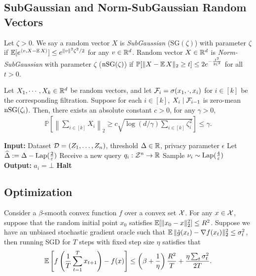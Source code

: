 \subsection{SubGaussian and Norm-SubGaussian Random Vectors}
\begin{definition}
Let $\zeta > 0$. We say a random vector $X$ is \emph{SubGaussian} ($\mathrm{SG}(\zeta)$) with parameter $\zeta$ if %
$\operatorname*{\mathbb{E}}[e^{\langle v,X-\operatorname*{\mathbb{E}} X\rangle}]\le e^{\|v\|^2\zeta^2/2}$ for any $v\in \mathbb{R}^d$.
Random vector $X\in \mathbb{R}^d$ is \emph{Norm-SubGaussian} with parameter $\zeta$ ($\mathrm{nSG}(\zeta)$) if 
$\mathbb{P}[\|X-\operatorname*{\mathbb{E}} X\|_2\ge t]\le 2e^{-\frac{t^2}{2\zeta^2}}$ for all $t > 0$.
\end{definition}

\begin{theorem}
\label{thm:hoeffding_nSG}
    Let $X_1,\cdots,X_k\in\mathbb{R}^d$ be random vectors, and let $\mathcal{F}_i=\sigma(x_1,\cdot,x_i)$ for $i\in[k]$ be the corresponding filtration.
    Suppose for each $i\in[k]$, $X_i\mid \mathcal{F}_{i-1}$ is zero-mean $\mathrm{nSG}(\zeta_i)$. Then, there exists an absolute constant $c>0$, for any $\gamma>0$,
    \begin{align*}
        \mathbb{P}\left[\left\|\sum_{i\in[k]}X_i\right\|_2\ge c\sqrt{\log (d/\gamma)\sum_{i\in[k]}\zeta_i^2}\right]\le \gamma.
    \end{align*}
\end{theorem}

\begin{algorithm2e}
\caption{$\AboTh$}
\label{alg:mean_est_with_AT}
\textbf{ Input:} Dataset $\mathcal{D} = (Z_1,\dots,Z_n) $, threshold $\Delta \in \mathbb{R}$, privacy parameter $\epsilon$\;
Let $\widehat{\Delta}:= \Delta-\mathrm{Lap}(\frac{2}{\varepsilon})$\;
{
Receive a new query $q_i: \mathcal{Z}^n \to \mathbb{R}$ \;
Sample $\nu_i \sim \mathrm{Lap}(\frac{4}{\varepsilon})$\;
{
\textbf{ Output:} $a_i=\bot$\;
\textbf{ Halt}\;
}
}
\end{algorithm2e}


\subsection{Optimization}
\begin{lemma}
\label{lm:sgd_smooth}
Consider a $\beta$-smooth convex function $f$ over a convex set $\mathcal{X}$.
For any $x\in\mathcal{X}$, suppose that the random initial point $x_0$ satisfies $\operatorname*{\mathbb{E}}[\|x_0-x\|_2^2]\le R^2$.
Suppose we have an unbiased stochastic gradient oracle such that $\operatorname*{\mathbb{E}}\|\Tilde{g}(x_t)-\nabla f(x_t)\|_2^2\le \sigma_t^2$, then running SGD for $T$ steps with fixed step size $\eta$ satisfies that
\begin{align*}
    \operatorname*{\mathbb{E}}\left[f \left(\frac{1}{T}\sum_{t=1}^{T}x_{t+1} \right)-f(x)\right]\le \left(\beta+\frac{1}{\eta} \right)\frac{R^2}{T} + \frac{\eta\sum_t\sigma_t^2}{2T}.
\end{align*}
\end{lemma}




